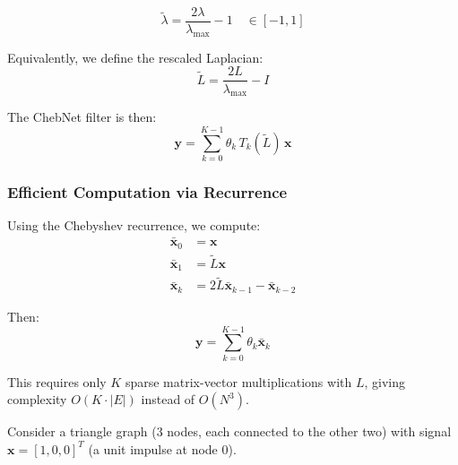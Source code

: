\begin{notechapter}
\begin{equation}
\tilde{\lambda} = \frac{2\lambda}{\lambda_{\max}} - 1 
\quad \in [-1, 1]
\end{equation}

Equivalently, we define the rescaled Laplacian:
\begin{equation}
\tilde{L} = \frac{2L}{\lambda_{\max}} - I
\end{equation}

The ChebNet filter is then:
\begin{equation}
\mathbf{y} = \sum_{k=0}^{K-1} \theta_k \, T_k(\tilde{L}) \, \mathbf{x}
\end{equation}

\subsubsection{Efficient Computation via Recurrence}

Using the Chebyshev recurrence, we compute:
\begin{align}
\bar{\mathbf{x}}_0 &= \mathbf{x} \\
\bar{\mathbf{x}}_1 &= \tilde{L} \mathbf{x} \\
\bar{\mathbf{x}}_k &= 2\tilde{L} \bar{\mathbf{x}}_{k-1} - \bar{\mathbf{x}}_{k-2}
\end{align}

Then:
\[
\mathbf{y} = \sum_{k=0}^{K-1} \theta_k \bar{\mathbf{x}}_k
\]

This requires only $K$ sparse matrix-vector multiplications with $L$, 
giving complexity $O(K \cdot |E|)$ instead of $O(N^3)$.

\begin{example}
Consider a triangle graph (3 nodes, each connected to the other two) 
with signal $\mathbf{x} = [1, 0, 0]^T$ (a unit impulse at node 0).

\begin{center}
\end{center}
\end{example}
\end{notechapter}
